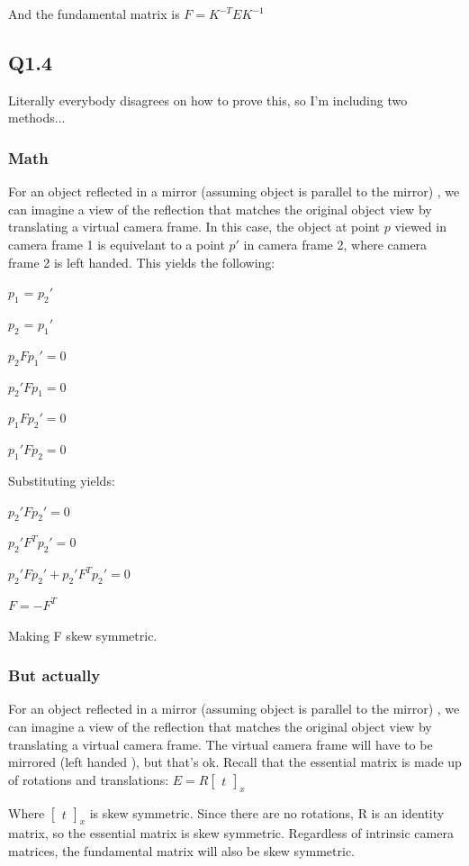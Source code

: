 \documentclass[12pt]{article}
\begin{document}
And the fundamental matrix is $F = K^{-T} E K^{-1}$ 

\newpage
\subsection{Q1.4}
Literally everybody disagrees on how to prove this, so I'm including two methods...
\subsubsection{Math}
For an object reflected in a mirror (assuming object is parallel to the mirror) , we can imagine a view of the reflection that matches the original object view by translating a virtual camera frame.  
In this case, the object at point $p$ viewed in camera frame 1 is equivelant to a point $p'$ in camera frame 2, where camera frame 2 is left handed.
This yields the following:
  
$p_{1}$ = $p_{2}'$  
  
$p_{2}$ = $p_{1}'$  
  
$p_{2}  F p_{1}' = 0$  
  
$p_{2}' F p_{1}  = 0$  
  
$p_{1}  F p_{2}' = 0$  
  
$p_{1}' F p_{2}  = 0$  

Substituting yields: 
  
$p_{2}' F     p_{2}' = 0$
  
$p_{2}' F^{T} p_{2}' = 0$
  
$p_{2}' F     p_{2}' + p_{2}' F^{T} p_{2}' = 0$
  
$F = -F^{T}$
  
Making F skew symmetric.

\subsubsection{But actually}
For an object reflected in a mirror (assuming object is parallel to the mirror) , we can imagine a view of the reflection that matches the original object view by translating a virtual camera frame. The virtual camera frame will have to be mirrored (left handed ), but that's ok.
Recall that the essential matrix is made up of rotations and translations:
$E = R \begin{bmatrix} t \end{bmatrix}_{x}$ 

Where $\begin{bmatrix} t \end{bmatrix}_{x}$ is skew symmetric. Since there are no rotations, R is an identity matrix, so the essential matrix is skew symmetric.
Regardless of intrinsic camera matrices, the fundamental matrix will also be skew symmetric.
\end{document}
